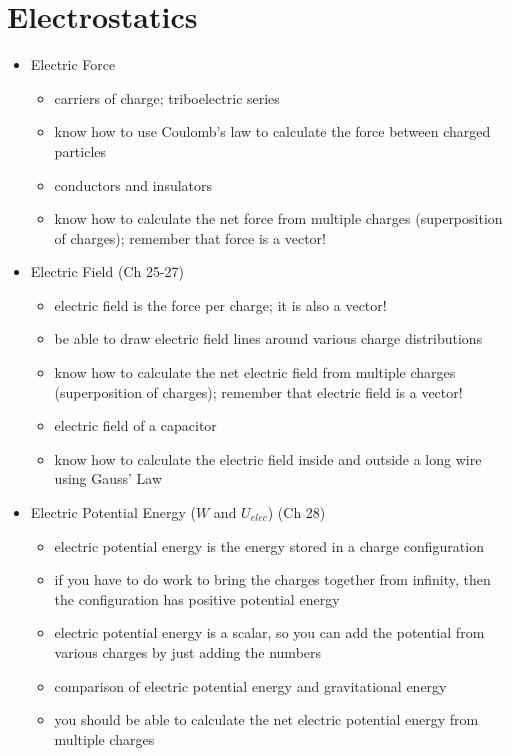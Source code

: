 \section{Electrostatics}%
\begin{itemize}
\item Electric Force %
\begin{itemize}
\item carriers of charge; triboelectric series
\item know how to use Coulomb's law to calculate the force between
  charged particles
\item conductors and insulators
\item know how to calculate the net force from multiple charges (superposition of charges);
  remember that force is a vector!
\end{itemize}

\item Electric Field (Ch 25-27)
\begin{itemize}
\item electric field is the force per charge; it is also a vector!
\item be able to draw electric field lines around various charge
  distributions 
\item know how to calculate the net electric field from multiple charges (superposition of
  charges); remember that electric field is a vector!
\item electric field of a capacitor
\item know how to calculate the electric field inside and outside a
  long wire using Gauss' Law 
\end{itemize}

\item Electric Potential Energy ($W$ and $U_{elec}$) (Ch 28)
\begin{itemize}
\item electric potential energy is the energy stored in a charge configuration
\item if you have to do work to bring the charges together from
  infinity, then the configuration has positive potential energy
\item electric potential energy is a scalar, so you can add the potential from various charges by just adding the numbers
\item comparison of electric potential energy and gravitational energy
\item you should be able to calculate the net electric potential energy from multiple charges
\end{itemize}


\end{itemize}
